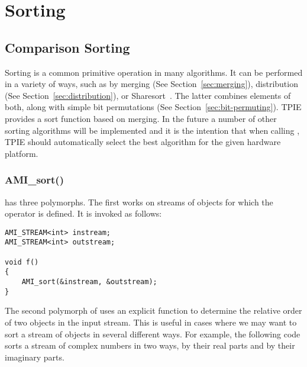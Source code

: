 \section{Sorting}

\subsection{Comparison Sorting} \label{sec:cmp-sorting}

Sorting is a common primitive operation in many algorithms.  It can be
performed in a variety of ways, such as by merging (See
Section~\ref{sec:merging}), distribution (See
Section~\ref{sec:distribution}), or Sharesort~\cite{aggarwal:optimal}. The
latter combines elements of both, along with simple bit permutations
(See Section~\ref{sec:bit-permuting}). TPIE provides a sort function
 based on merging. In the future a number of other sorting
algorithms will be implemented and it is the intention that when
calling , TPIE should automatically select the best
algorithm for the given hardware platform.


\subsubsection{AMI\_sort()}
 has three polymorphs. The first works on streams of
objects for which the operator \myverb{<} is defined. It is invoked as
follows:

\begin{verbatim}
AMI_STREAM<int> instream;
AMI_STREAM<int> outstream;

void f()
{
    AMI_sort(&instream, &outstream);
}
\end{verbatim}

The second polymorph of  uses an explicit function to
determine the relative order of two objects in the input stream.  This
is useful in cases where we may want to sort a stream of objects in
several different ways.  For example, the following code sorts a
stream of complex numbers in two ways, by their real parts and by
their imaginary parts.


